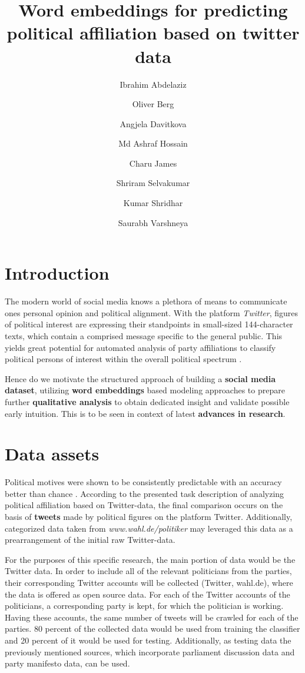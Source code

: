 \documentclass[10pt, oneside]{article}
\title{Word embeddings for predicting political affiliation based on twitter data}
\author[]{Ibrahim Abdelaziz}
\author[]{Oliver Berg}
\author[]{Angjela Davitkova}
\author[]{Md Ashraf Hossain}
\author[]{Charu James}
\author[]{Shriram Selvakumar}
\author[]{Kumar Shridhar}
\author[]{Saurabh Varshneya}
\affil[1]{Technische Universität Kaiserslautern}
\begin{document}
\maketitle
\begin{multicols}{2}


\section{Introduction}

The modern world of social media knows a plethora of means to communicate ones personal opinion and political alignment. With the platform \textit{Twitter}, figures of political interest are expressing their standpoints in small-sized 144-character texts, which contain a comprised message specific to the general public. This yields great potential for automated analysis of party affiliations to classify political persons of interest within the overall political spectrum \cite{Biessmann2017}.

Hence do we motivate the structured approach of building a \textbf{social media dataset}, utilizing \textbf{word embeddings} \cite{Pelevinala2016} based modeling approaches to prepare further \textbf{qualitative analysis} to obtain dedicated insight and validate possible early intuition.
This is to be seen in context of latest \textbf{advances in research}.

\section{Data assets}

Political motives were shown to be consistently predictable with an accuracy better than chance \cite{Biessmann2017}.
According to the presented task description of analyzing political affiliation based on Twitter-data, the final comparison occurs on the basis of \textbf{tweets} made by political figures on the platform Twitter.
Additionally, categorized data taken from \textit{www.wahl.de/politiker} may leveraged this data as a prearrangement of the initial raw Twitter-data.

For the purposes of this specific research, the main portion of data would be the Twitter data. In order to include all of the relevant politicians from the parties, their corresponding Twitter accounts will be collected (Twitter, wahl.de), where the data is offered as open source data.
For each of the Twitter accounts of the politicians, a corresponding party is kept, for which the politician is working. Having these accounts, the same number of tweets will be crawled for each of the parties. 80 percent of the collected data would be used from training the classifier and 20 percent of it would be used for testing.
Additionally, as testing data the previously mentioned sources, which incorporate parliament discussion data and party manifesto data, can be used. 



\end{multicols}
\end{document}
